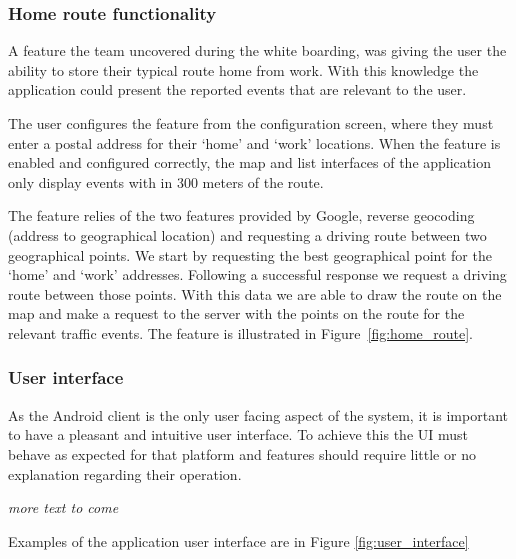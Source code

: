 \subsubsection{Home route functionality}
A feature the team uncovered during the white boarding, was giving the user the
ability to store their typical route home from work. With this knowledge the
application could present the reported events that are relevant to the user.

The user configures the feature from the configuration screen, where they must
enter a postal address for their ‘home’ and ‘work’ locations. When the feature
is enabled and configured correctly, the map and list interfaces of the
application only display events with in 300 meters of the route.

The feature relies of the two features provided by Google, reverse geocoding
(address to geographical location) and requesting a driving route between two
geographical points. We start by requesting the best geographical point for the
‘home’ and ‘work’ addresses. Following a successful response we request a
driving route between those points. With this data we are able to draw the
route on the map and make a request to the server with the points on the route
for the relevant traffic events. The feature is illustrated in Figure~\ref{fig:home_route}.

\subsubsection{User interface}

As the Android client is the only user facing aspect of the system, it is
important to have a pleasant and intuitive user interface. To achieve this the
UI must behave as expected for that platform and features should require little
or no explanation regarding their operation.

\emph{more text to come}

Examples of the application user interface are in Figure
\ref{fig:user_interface}

